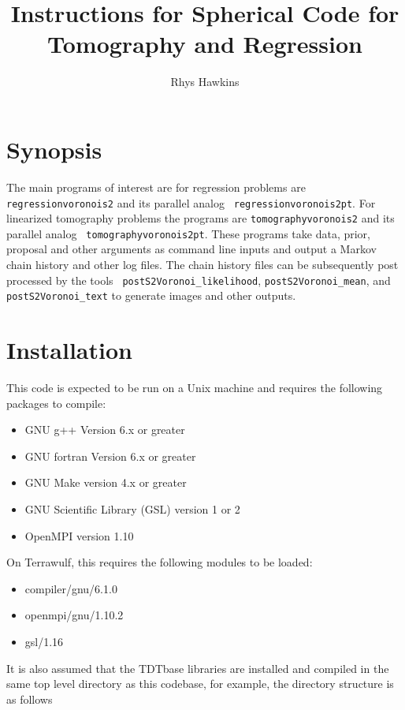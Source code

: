 \documentclass{article}
\begin{document}
\title{Instructions for Spherical Code for Tomography and Regression}
\author{Rhys Hawkins}

\maketitle

\section{Synopsis}

The main programs of interest are for regression problems are {\tt
  regressionvoronois2} and its parallel analog {\tt
  regressionvoronois2pt}.  For linearized tomography problems the
programs are {\tt tomographyvoronois2} and its parallel analog {\tt
  tomographyvoronois2pt}.  These programs take data, prior, proposal
and other arguments as command line inputs and output a Markov chain
history and other log files.  The chain history files can be
subsequently post processed by the tools {\tt
  postS2Voronoi\_likelihood}, {\tt postS2Voronoi\_mean}, and {\tt
  postS2Voronoi\_text} to generate images and other outputs.

\section{Installation}

This code is expected to be run on a Unix machine and requires the
following packages to compile:

\begin{itemize}
\item GNU g++ Version 6.x or greater
\item GNU fortran Version 6.x or greater
\item GNU Make version 4.x or greater
\item GNU Scientific Library (GSL) version 1 or 2
\item OpenMPI version 1.10
\end{itemize}



On Terrawulf, this requires the following modules to be loaded:
\begin{itemize}
\item compiler/gnu/6.1.0
\item openmpi/gnu/1.10.2
\item gsl/1.16
\end{itemize}

It is also assumed that the TDTbase libraries are installed and
compiled in the same top level directory as this codebase, for
example, the directory structure is as follows
\end{document}
